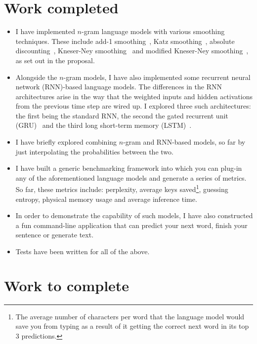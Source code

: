 \documentclass[a4paper, 12pt]{article}
\begin{document}
\section*{Work completed}

\begin{itemize}
\item
	I have implemented $n$-gram language models with various smoothing techniques. These include add-1 smoothing~\cite{add1_smoothing:johnson1932}, Katz smoothing~\cite{katz_smoothing:katz1987}, absolute discounting~\cite{absolute_discounting:ney1994}, Kneser-Ney smoothing~\cite{kneser_ney_smoothing:kneser1995} and modified Kneser-Ney smoothing~\cite{modified_kneser_ney:chen1999}, as set out in the proposal.
	
\item
	Alongside the $n$-gram models, I have also implemented some recurrent neural network (RNN)-based language models. The differences in the RNN architectures arise in the way that the weighted inputs and hidden activations from the previous time step are wired up. I explored three such architectures: the first being the standard RNN\cite{rnn_lm:mikolov2010}, the second the gated recurrent unit (GRU)~\cite{gru:cho2014} and the third long short-term memory (LSTM)~\cite{lstm:hochreiter1997}.

\item
	I have briefly explored combining $n$-gram and RNN-based models, so far by just interpolating the probabilities between the two.

\item
	I have built a generic benchmarking framework into which you can plug-in any of the aforementioned language models and generate a series of metrics. So far, these metrics include: perplexity, average keys saved\footnote{The average number of characters per word that the language model would save you from typing as a result of it getting the correct next word in its top 3 predictions.}, guessing entropy, physical memory usage and average inference time.

\item
	In order to demonstrate the capability of such models, I have also constructed a fun command-line application that can predict your next word, finish your sentence or generate text.
	
\item
	Tests have been written for all of the above.
\end{itemize}

\section*{Work to complete}
\end{document}
